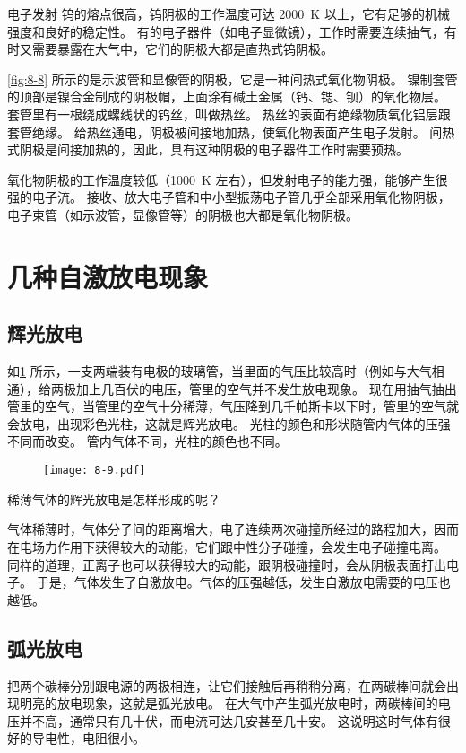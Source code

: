 \begin{Reading}{电子发射}
钨的熔点很高，钨阴极的工作温度可达 \qty{2000}{K} 以上，它有足够的机械强度和良好的稳定性。
有的电子器件（如电子显微镜），工作时需要连续抽气，有时又需要暴露在大气中，它们的阴极大都是直热式钨阴极。

\cref{fig:8-8} 所示的是示波管和显像管的阴极，它是一种间热式氧化物阴极。
镍制套管的顶部是镍合金制成的阴极帽，上面涂有碱土金属（钙、锶、钡）的氧化物层。
套管里有一根绕成螺线状的钨丝，叫做热丝。
热丝的表面有绝缘物质氧化铝层跟套管绝缘。
给热丝通电，阴极被间接地加热，使氧化物表面产生电子发射。
间热式阴极是间接加热的，因此，具有这种阴极的电子器件工作时需要预热。

氧化物阴极的工作温度较低（\qty{1000}{K} 左右），但发射电子的能力强，能够产生很强的电子流。
接收、放大电子管和中小型振荡电子管几乎全部采用氧化物阴极，电子束管（如示波管，显像管等）的阴极也大都是氧化物阴极。
\end{Reading}

\section{几种自激放电现象}\label{sec:self_excited_discharge}
\subsection{辉光放电}
如\cref{fig:8-9} 所示，一支两端装有电极的玻璃管，当里面的气压比较高时（例如与大气相通），给两极加上几百伏的电压，管里的空气并不发生放电现象。
现在用抽气抽出管里的空气，当管里的空气十分稀薄，气压降到几千帕斯卡以下时，管里的空气就会放电，出现彩色光柱，这就是辉光放电。
光柱的颜色和形状随管内气体的压强不同而改变。
管内气体不同，光柱的颜色也不同。

\begin{figure}
  \texttt{[image: 8-9.pdf]}
  \caption{}\label{fig:8-9}
\end{figure}

稀薄气体的辉光放电是怎样形成的呢？

气体稀薄时，气体分子间的距离增大，电子连续两次碰撞所经过的路程加大，因而在电场力作用下获得较大的动能，它们跟中性分子碰撞，会发生电子碰撞电离。
同样的道理，正离子也可以获得较大的动能，跟阴极碰撞时，会从阴极表面打出电子。
于是，气体发生了自激放电。气体的压强越低，发生自激放电需要的电压也越低。

\subsection{弧光放电} 
把两个碳棒分别跟电源的两极相连，让它们接触后再稍稍分离，在两碳棒间就会出现明亮的放电现象，这就是弧光放电。
在大气中产生弧光放电时，两碳棒间的电压并不高，通常只有几十伏，而电流可达几安甚至几十安。
这说明这时气体有很好的导电性，电阻很小。

